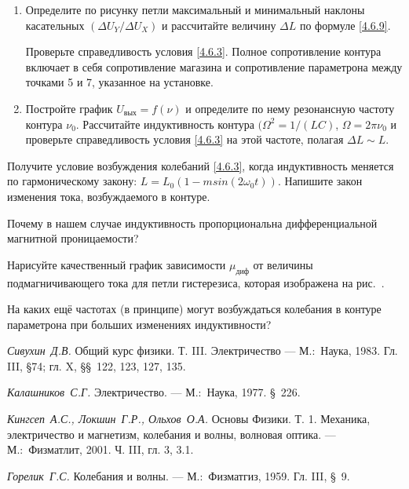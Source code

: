 \begin{lab:task}

\begin{enumerate}
\item 
Определите по рисунку петли максимальный и минимальный наклоны касательных $(\Delta U_Y/ \Delta U_X)$ и рассчитайте величину $\Delta L$ по формуле \eqref{4.6.9}. 

Проверьте справедливость условия \eqref{4.6.3}. Полное сопротивление контура включает в себя сопротивление магазина и сопротивление параметрона между точками 5 и 7, указанное на установке. 

\item 
Постройте график $U_\text{вых} = f(\nu)$ и определите по нему резонансную частоту контура $\nu_0$. Рассчитайте индуктивность контура $(\Omega^2 = 1/ (LC)$, $\Omega = 2\pi\nu_0$ и проверьте справедливость условия \eqref{4.6.3} на этой частоте, полагая $\Delta L \sim L$.
\end{enumerate}
\end{lab:task}

\begin{lab:questions}
\item 
Получите условие возбуждения колебаний \eqref{4.6.3}, когда индуктивность меняется по гармоническому закону: $L = L_0(1-msin(2\omega_0t))$. Напишите закон изменения тока, возбуждаемого в контуре. 

\item 
Почему в нашем случае индуктивность пропорциональна дифференциальной магнитной проницаемости? 

\item 
Нарисуйте качественный график зависимости $\mu_\text{диф}$ от величины подмагничивающего тока для петли гистерезиса, которая изображена на рис.~.

\item 
На каких ещё частотах (в принципе) могут возбуждаться колебания в контуре параметрона при больших изменениях индуктивности? 
\end{lab:questions}

\begin{lab:literature}
\item 
\emph{Сивухин~Д.В.} Общий курс физики. Т. III. Электричество --- М.:~Наука, 1983. Гл. III, \S 74; гл. X, \S\S~122, 123, 127, 135. 

\item 
\emph{Калашников~С.Г.} Электричество. --- М.:~Наука, 1977. \S~226. 

\item 
\emph{Кингсеп~А.С., Локшин~Г.Р., Ольхов~О.А.} Основы Физики. Т. 1. Механика, электричество и магнетизм, колебания и волны, волновая оптика. --- М.:~Физматлит, 2001. Ч. III, гл. 3, 3.1. 

\item 
\emph{Горелик~Г.С.} Колебания и волны. --- М.:~Физматгиз, 1959. Гл. III, \S~9.
\end{lab:literature}